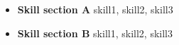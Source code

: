 \begin {itemize}
	\item
		\textbf {Skill section A} skill1, skill2, skill3 
	\item

		\textbf {Skill section B} skill1, skill2, skill3 
\end {itemize}

